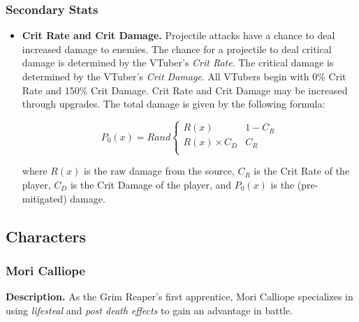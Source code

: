 \documentclass[10pt, a4paper]{article}
\begin{document}
  	\subsubsection{Secondary Stats}
  	
  	\begin{itemize}
  	 \item \textbf{Crit Rate and Crit Damage.} Projectile attacks have a chance to deal increased damage to enemies. The chance for a projectile to deal critical damage is determined by the VTuber's \textit{Crit Rate}. The critical damage is determined by the VTuber's \textit{Crit Damage}. All VTubers begin with 0\% Crit Rate and 150\% Crit Damage. Crit Rate and Crit Damage may be increased through upgrades. The total damage is given by the following formula:

  	 \[
	  	 P_0(x) = Rand\begin{cases}
	  	 	R(x) & 1 - C_R\\
	  	 	R(x) \times C_D & C_R \\
	  	 \end{cases}
  	 \]
  	 
  	 where $R(x)$ is the raw damage from the source, $C_R$ is the Crit Rate of the player, $C_D$ is the Crit Damage of the player, and $P_0(x)$ is the (pre-mitigated) damage.
  	 
  	\end{itemize}
  
  	\subsection{Characters} \label{Characters}
  	
  	\subsubsection{Mori Calliope}
  	
  	\textbf{Description.} As the Grim Reaper's first apprentice, Mori Calliope specializes in using \textit{lifesteal} and \textit{post death effects} to gain an advantage in battle.
  	
\end{document}
